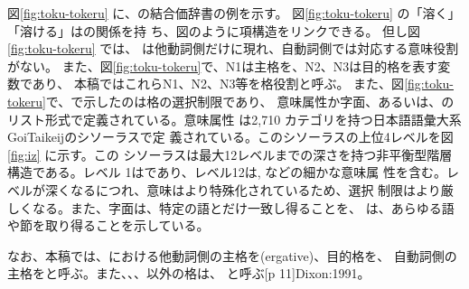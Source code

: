\documentclass[japanese]{jnlp}
\newcommand{\eng}[1]{}
\newcommand{\gm}[1]{}
\newcommand{\iz}[1]{}
\newcommand{\izj}[1]{}
\newcommand{\abs}{}
\newcommand{\sbj}{}
\newcommand{\obj}{}
\newcommand{\ix}{}
\newcommand{\ul}[1]{}
\newcommand{\soalt}{}
\newcommand{\citep}{}
\newcommand{\altje}{}
\def\smpt#1{}
\renewcommand{\smpt}[1]{}
\newcommand{\tot}{}
\begin{document}


図\ref{fig:toku-tokeru} に、\altje の結合価辞書の例を示す。
図\ref{fig:toku-tokeru} の「溶く」 \tot 「溶ける」は\soalt の関係を持
ち、図のように項構造をリンクできる。
但し図\ref{fig:toku-tokeru} では、
\abs{}は他動詞側だけに現れ、自動詞側では対応する意味役割がない。
また、図\ref{fig:toku-tokeru}で、N1は主格を、N2、N3は目的格を表す変数であり、
本稿ではこれらN1、N2、N3等を格役割と呼ぶ。
また、図\ref{fig:toku-tokeru}で、\izj{ }で示したのは格の選択制限であり、
意味属性か字面、あるいは、\iz{*}のリスト形式で定義されている。意味属性
は2,710 カテゴリを持つ日本語語彙大系\citep{GoiTaikeij}のシソーラスで定
義されている。このシソーラスの上位4レベルを図\ref{fig:iz} に示す。この
シソーラスは最大12レベルまでの深さを持つ非平衡型階層構造である。レベル
1は\iz{名詞}であり、レベル12は\iz{農作業}, \iz{出演}などの細かな意味属
性を含む。レベルが深くなるにつれ、意味はより特殊化されているため、選択
制限はより厳しくなる。また、字面は、特定の語とだけ一致し得ることを、
\iz{*}は、あらゆる語や節を取り得ることを示している。


なお、本稿では、\soalt{}における他動詞側の主格を\abs (ergative)、目的格を\obj{}、
自動詞側の主格を\sbj{}と呼ぶ。また、\abs{}、\obj{}、\sbj{}以外の格は、
\ix{}と呼ぶ\citep[p 11]{Dixon:1991}。


\smpt{調査対象と実験対象}
\end{document}

